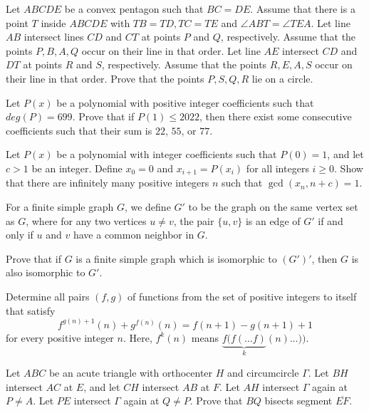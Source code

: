 \documentclass[11pt]{scrartcl}
\begin{document}
\begin{problem}[8417327567048605288]
Let $ABCDE$ be a convex pentagon such that $BC=DE$. Assume that there is a point $T$ inside $ABCDE$ with $TB=TD,TC=TE$ and $\angle ABT = \angle TEA$. Let line $AB$ intersect lines $CD$ and $CT$ at points $P$ and $Q$, respectively. Assume that the points $P,B,A,Q$ occur on their line in that order. Let line $AE$ intersect $CD$ and $DT$ at points $R$ and $S$, respectively. Assume that the points $R,E,A,S$ occur on their line in that order. Prove that the points $P,S,Q,R$ lie on a circle.
\end{problem}
\begin{problem}[8447379793908140507]
	Let $P(x)$ be a polynomial with positive integer coefficients such that $deg(P)=699$. Prove that if $P(1) \le 2022$, then there exist some consecutive coefficients such that their sum is $22$, $55$, or $77$.
\end{problem}
\begin{problem}[8463873707700703744]
Let $P(x)$ be a polynomial with integer coefficients such that $P(0)=1$, and let $c > 1$ be an integer. Define $x_0=0$ and $x_{i+1} = P(x_i)$ for all integers $i \ge 0$. Show that there are infinitely many positive integers $n$ such that $\gcd (x_n, n+c)=1$.
\end{problem}
\begin{problem}[8489819892706651399]
For a finite simple graph $G$, we define $G'$ to be the graph on the same vertex set as $G$, where for any two vertices $u \neq v$, the pair $\{u,v\}$ is an edge of $G'$ if and only if $u$ and $v$ have a common neighbor in $G$.

Prove that if $G$ is a finite simple graph which is isomorphic to $(G')'$, then $G$ is also isomorphic to $G'$.
\end{problem}
\begin{problem}[8493928466779199543]
	Determine all pairs $(f,g)$ of functions from the set of positive integers to itself that satisfy\[f^{g(n)+1}(n) + g^{f(n)}(n) = f(n+1) - g(n+1) + 1\]for every positive integer $n$. Here, $f^k(n)$ means $\underbrace{f(f(\ldots f)}_{k}(n) \ldots ))$.
\end{problem}
\begin{problem}[8528437132500966626]
	Let $ABC$ be an acute triangle with orthocenter $H$ and circumcircle $\Gamma$. Let $BH$ intersect $AC$ at $E$, and let $CH$ intersect $AB$ at $F$. Let $AH$ intersect $\Gamma$ again at $P \neq A$. Let $PE$ intersect $\Gamma$ again at $Q \neq P$. Prove that $BQ$ bisects segment $\overline{EF}$.
\end{problem}
\end{document}
